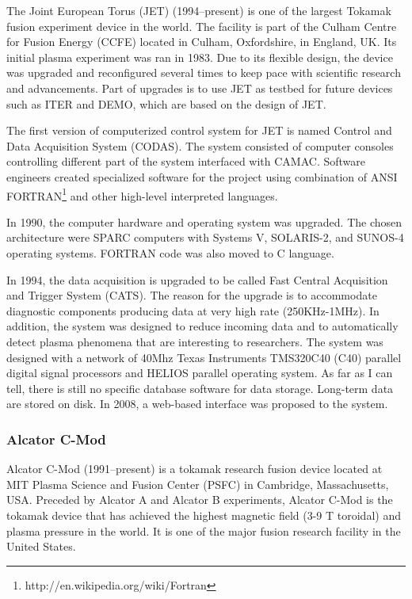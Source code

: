 The Joint European Torus (JET)\cite{gibson1977jet, website:jet_ccfe, 0029-5515-25-9-003} (1994--present) is one of the largest Tokamak fusion experiment device in the world. The facility is part of the Culham Centre for Fusion Energy (CCFE) located in Culham, Oxfordshire, in England, UK. Its initial plasma experiment was ran in 1983. Due to its flexible design, the device was upgraded and reconfigured several times to keep pace with scientific research and advancements. Part of upgrades is to use JET as testbed for future devices such as ITER\cite{dietz1996iter,di2011codac} and DEMO\cite{konishi2002demo}, which are based on the design of JET.

The first version of computerized control system for JET is named Control and Data Acquisition System (CODAS)\cite{van1987codas}. The system consisted of computer consoles controlling different part of the system interfaced with CAMAC. Software engineers created specialized software for the project using combination of ANSI FORTRAN\footnote{http://en.wikipedia.org/wiki/Fortran} and other high-level interpreted languages.

In 1990, the computer hardware and operating system was upgraded. The chosen architecture were SPARC computers with Systems V, SOLARIS-2, and SUNOS-4 operating systems. FORTRAN code was also moved to C language\cite{Krom1999265}.

In 1994, the data acquisition is upgraded to be called Fast Central Acquisition and Trigger System (CATS)\cite{blackler1994jet}. The reason for the upgrade is to accommodate diagnostic components producing data at very high rate (250KHz-1MHz). In addition, the system was designed to reduce incoming data and to automatically detect plasma phenomena that are interesting to researchers. The system was designed with a network of 40Mhz Texas Instruments TMS320C40 (C40) parallel digital signal processors and HELIOS parallel operating system. As far as I can tell, there is still no specific database software for data storage. Long-term data are stored on disk. In 2008, a web-based interface was proposed to the system\cite{hogben2008interfacing}.

\subsubsection{Alcator C-Mod}

Alcator C-Mod (1991--present) is a tokamak research fusion device located at MIT Plasma Science and Fusion Center (PSFC) in Cambridge, Massachusetts, USA. Preceded by Alcator A and Alcator B experiments, Alcator C-Mod is the tokamak device that has achieved the highest magnetic field (3-9 T toroidal) and plasma pressure in the world. It is one of the major fusion research facility in the United States.

